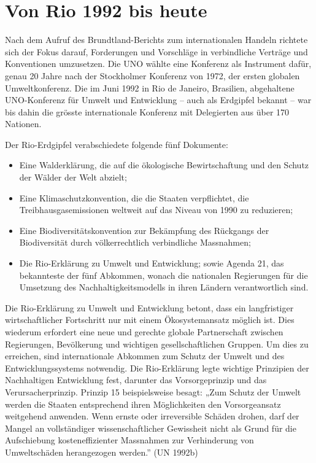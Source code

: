 \documentclass[
  nswissgerman,
  a4paper,
  openany]{book}
\providecommand{\tightlist}{%
  \setlength{\itemsep}{0pt}\setlength{\parskip}{0pt}}
\begin{document}
\section{Von Rio 1992 bis heute}\label{von-rio-1992-bis-heute}

Nach dem Aufruf des Brundtland-Berichts zum internationalen Handeln
richtete sich der Fokus darauf, Forderungen und Vorschläge in
verbindliche Verträge und Konventionen umzusetzen. Die UNO wählte eine
Konferenz als Instrument dafür, genau 20 Jahre nach der Stockholmer
Konferenz von 1972, der ersten globalen Umweltkonferenz. Die im Juni
1992 in Rio de Janeiro, Brasilien, abgehaltene UNO-Konferenz für Umwelt
und Entwicklung -- auch als Erdgipfel bekannt -- war bis dahin die
grösste internationale Konferenz mit Delegierten aus über 170 Nationen.

Der Rio-Erdgipfel verabschiedete folgende fünf Dokumente:

\begin{itemize}
\tightlist
\item
  Eine Walderklärung, die auf die ökologische Bewirtschaftung und den
  Schutz der Wälder der Welt abzielt;
\item
  Eine Klimaschutzkonvention, die die Staaten verpflichtet, die
  Treibhausgasemissionen weltweit auf das Niveau von 1990 zu reduzieren;
\item
  Eine Biodiversitätskonvention zur Bekämpfung des Rückgangs der
  Biodiversität durch völkerrechtlich verbindliche Massnahmen;
\item
  Die Rio-Erklärung zu Umwelt und Entwicklung; sowie Agenda 21, das
  bekannteste der fünf Abkommen, wonach die nationalen Regierungen für
  die Umsetzung des Nachhaltigkeitsmodells in ihren Ländern
  verantwortlich sind.
\end{itemize}

Die Rio-Erklärung zu Umwelt und Entwicklung betont, dass ein
langfristiger wirtschaftlicher Fortschritt nur mit einem Ökosystemansatz
möglich ist. Dies wiederum erfordert eine neue und gerechte globale
Partnerschaft zwischen Regierungen, Bevölkerung und wichtigen
gesellschaftlichen Gruppen. Um dies zu erreichen, sind internationale
Abkommen zum Schutz der Umwelt und des Entwicklungssystems notwendig.
Die Rio-Erklärung legte wichtige Prinzipien der Nachhaltigen Entwicklung
fest, darunter das Vorsorgeprinzip und das Verursacherprinzip. Prinzip
15 beispielsweise besagt: „Zum Schutz der Umwelt werden die Staaten
entsprechend ihren Möglichkeiten den Vorsorgeansatz weitgehend anwenden.
Wenn ernste oder irreversible Schäden drohen, darf der Mangel an
vollständiger wissenschaftlicher Gewissheit nicht als Grund für die
Aufschiebung kosteneffizienter Massnahmen zur Verhinderung von
Umweltschäden herangezogen werden.'' (UN 1992b)
\end{document}
